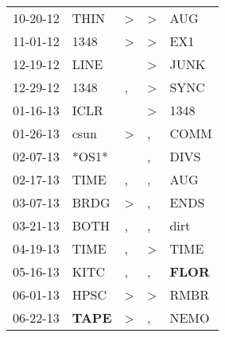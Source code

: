 \begin{supertabular}{p{0.07\textwidth}p{0.06\textwidth}p{0.02\textwidth}p{0.02\textwidth}p{0.06\textwidth}}
          10-20-12\textsuperscript{} &           THIN\textsuperscript{} &     \textgreater &     \textgreater &            AUG\textsuperscript{} \\
          11-01-12\textsuperscript{} &           1348\textsuperscript{} &     \textgreater &     \textgreater &            EX1\textsuperscript{} \\
          12-19-12\textsuperscript{} &           LINE\textsuperscript{} &                  &     \textgreater &           JUNK\textsuperscript{} \\
          12-29-12\textsuperscript{} &           1348\textsuperscript{} &                , &     \textgreater &           SYNC\textsuperscript{} \\
          01-16-13\textsuperscript{} &           ICLR\textsuperscript{} &                  &     \textgreater &           1348\textsuperscript{} \\
          01-26-13\textsuperscript{} &           csun\textsuperscript{} &     \textgreater &                , &           COMM\textsuperscript{} \\
          02-07-13\textsuperscript{} &                            *OS1* &                  &                , &           DIVS\textsuperscript{} \\
          02-17-13\textsuperscript{} &           TIME\textsuperscript{} &                , &                , &            AUG\textsuperscript{} \\
          03-07-13\textsuperscript{} &           BRDG\textsuperscript{} &     \textgreater &                , &           ENDS\textsuperscript{} \\
          03-21-13\textsuperscript{} &           BOTH\textsuperscript{} &                , &                , &           dirt\textsuperscript{} \\
          04-19-13\textsuperscript{} &           TIME\textsuperscript{} &                , &     \textgreater &           TIME\textsuperscript{} \\
          05-16-13\textsuperscript{} &           KITC\textsuperscript{} &                , &                , &  \textbf{FLOR\textsuperscript{}} \\
          06-01-13\textsuperscript{} &           HPSC\textsuperscript{} &     \textgreater &     \textgreater &           RMBR\textsuperscript{} \\
          06-22-13\textsuperscript{} &  \textbf{TAPE\textsuperscript{}} &     \textgreater &                , &           NEMO\textsuperscript{} \\

\end{supertabular}
